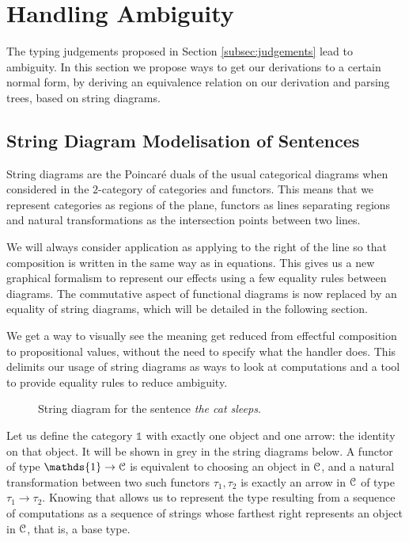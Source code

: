 \section{Handling Ambiguity}
\label{sec:nondet}
The typing judgements proposed in Section \ref{subsec:judgements} lead to
ambiguity.
In this section we propose ways to get our derivations to a certain normal
form, by deriving an equivalence relation on our derivation and parsing trees,
based on string diagrams.

\subsection{String Diagram Modelisation of Sentences}
\label{subsec:sd}
String diagrams are the Poincaré duals of the usual categorical diagrams when
considered in the $2$-category of categories and functors.
This means that we represent categories as regions of the plane, functors as
lines separating regions and natural transformations as the intersection points
between two lines.

We will always consider application as applying to the right of the line so
that composition is written in the same way as in equations.
This gives us a new graphical formalism to represent our effects using a few
equality rules between diagrams.
The commutative aspect of functional diagrams is now replaced by an equality of
string diagrams, which will be detailed in the following section.

We get a way to visually see the meaning get reduced from effectful composition
to propositional values, without the need to specify what the handler does.
This delimits our usage of string diagrams as ways to look at computations and
a tool to provide equality rules to reduce ambiguity.

\begin{wrapfigure}[17]{r}{.45\textwidth}
	\centering
	
	\caption{String diagram for the sentence \textsl{the cat sleeps}.}
	\label{fig:sd-thecatsleeps}
\end{wrapfigure}
Let us define the category $\mathds{1}$ with exactly one object and one arrow:
the identity on that object. It will be shown in grey in the string diagrams
below.
A functor of type $\mathds{1} \to \mC$ is equivalent to choosing an object in
$\mathcal{C}$, and a natural transformation between two such functors $\tau_{1},
	\tau_{2}$ is exactly an arrow in $\mathcal{C}$ of type $\tau_{1} \to \tau_{2}$.
Knowing that allows us to represent the type resulting from a sequence of
computations as a sequence of strings whose farthest right represents an object
in $\mathcal{C}$, that is, a base type.

